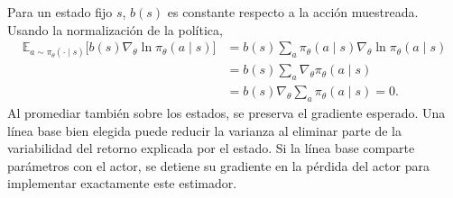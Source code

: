 Para un estado fijo $s$, $b(s)$ es constante respecto a la acción muestreada. Usando la normalización de la política,
\begin{align*}
    \mathbb{E}_{a\sim\pi_\theta(\cdot\mid s)}
       \big[b(s)\nabla_\theta\ln\pi_\theta(a\mid s)\big]
      &= b(s)\sum_a \pi_\theta(a\mid s)\nabla_\theta\ln\pi_\theta(a\mid s)\\
      &= b(s)\sum_a\nabla_\theta\pi_\theta(a\mid s)\\
      &= b(s)\nabla_\theta\sum_a\pi_\theta(a\mid s)=0.
\end{align*}
Al promediar también sobre los estados, se preserva el gradiente esperado. Una línea base bien elegida puede reducir la varianza al eliminar parte de la variabilidad del retorno explicada por el estado. Si la línea base comparte parámetros con el actor, se detiene su gradiente en la pérdida del actor para implementar exactamente este estimador.
